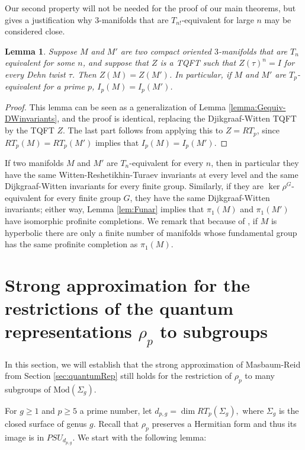 \documentclass[12pt]{amsart}
\newtheorem{lem}[thm]{Lemma}
\theoremstyle{definition}
\begin{document}
Our second property will not be needed for the proof of our main theorems, but gives a justification why $3$-manifolds that are $T_{n!}$-equivalent for large $n$ may be considered close.
\begin{lem}\label{lem:Tnequiv}
	Suppose $M$ and $M'$ are two compact oriented $3$-manifolds that are $T_n$ equivalent for some $n$, and suppose that $Z$ is a TQFT such that $Z(\tau)^n=I$ for every Dehn twist $\tau$. Then $Z(M)=Z(M')$. In particular, if $M$ and $M'$ are $T_p$-equivalent for a prime $p$, $I_p(M)=I_p(M')$.
\end{lem}
\begin{proof}
	This lemma can be seen as a generalization of Lemma \ref{lemma:Gequiv-DWinvariants}, and the proof is identical, replacing the Djikgraaf-Witten TQFT by the TQFT $Z$. The last part follows from applying this to $Z=RT_p$, since $RT_p(M)=RT_p(M')$ implies that $I_p(M)=I_p(M').$
\end{proof}

If two manifolds $M$ and $M'$ are $T_n$-equivalent for every $n$, then in particular they have the same Witten-Reshetikhin-Turaev invariants at every level and the same Dijkgraaf-Witten invariants for every finite group. Similarly, if they are $\ker \rho^G$-equivalent for every finite group $G$, they have the same Dijkgraaf-Witten invariants; either way, Lemma \ref{lem:Funar} implies that $\pi_1(M)$ and $\pi_1(M')$ have isomorphic profinite completions. We remark that because of \cite{Liu23}, if $M$ is hyperbolic there are only a finite number of manifolds whose fundamental group has the same profinite completion as $\pi_1(M)$.


\section{Strong approximation for the restrictions of the quantum representations $\rho_p$ to subgroups}
\label{sec:strongApprox}

In this section, we will establish that the strong approximation of Masbaum-Reid from Section \ref{sec:quantumRep} still holds for the restriction of $\rho_p$ to many subgroups of $\mathrm{Mod}(\Sigma_g).$

For $g\geq 1$ and $p\geq 5$ a prime number, let $d_{p,g}=\dim RT_p(\Sigma_g),$ where $\Sigma_g$ is the closed surface of genus $g.$ Recall that $\rho_p$ preserves a Hermitian form and thus its image is in $PSU_{d_{p,g}}$. We start with the following lemma:
\end{document}
